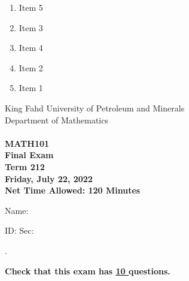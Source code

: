 \documentclass[amsfonts,bezier,leqno,fleqn,12pt,a4paper]{article}
\begin{document}
{{{\begin{large}
\begin{enumerate}
\begin{enumerate}
\item  Item 5
\item  Item 3
\item  Item 4
\item  Item 2
\item  Item 1

\end{enumerate}
\newpage


\end{enumerate}
\end{large}


\newpage


\thispagestyle{empty}
\begin{center}
    \begin{large}
        King Fahd University of Petroleum and Minerals \\ 
        Department of Mathematics  \\ 
        \vspace*{4.5cm}
        {\bf {} }  \hfill {\bf {}} \\
        {\bf MATH101 }  \\
        {\bf Final Exam }  \\
        {\bf Term 212 }  \\
        {\bf Friday, July 22, 2022 }  \\ 
        {\bf Net Time Allowed: 120 Minutes }  \\
        \vspace*{0.2cm}

    \end{large}
\end{center}

\large{Name:  }\hrulefill

\vspace{3mm}

\large{ID: } \hrulefill \large{  Sec: } \hrulefill \large{.

\vspace{1cm}

\large{\bf{Check that this exam has {\underline{ 10 }} questions.}}

\vspace{1cm}

}}}}
\end{document}
